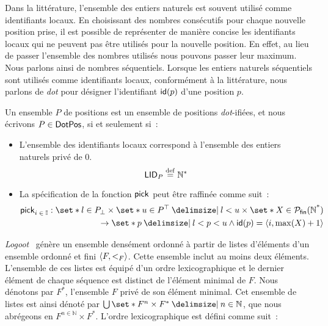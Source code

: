 Dans la littérature, l'ensemble des entiers naturels est souvent utilisé comme identifiants locaux.
En choisissant des nombres consécutifs pour chaque nouvelle position prise, il est possible de représenter de manière concise les identifiants locaux qui ne peuvent pas être utilisés pour la nouvelle position.
En effet, au lieu de passer l'ensemble des nombres utilisés nous pouvons passer leur maximum.
Nous parlons ainsi de nombres séquentiels.
Lorsque les entiers naturels séquentiels sont utilisés comme identifiants locaux, conformément à la littérature, nous parlons de \emph{dot} pour désigner l'identifiant $\trm{id}(p)$ d'une position $p$.

\begin{definition}\label{def:dot-pos}
Un ensemble $P$ de positions est un ensemble de positions \emph{dot}-ifiées, et nous écrivons $P \in \trm{DotPos}$, si et seulement si~:
\begin{itemize}
\item L'ensemble des identifiants locaux correspond à l'ensemble des entiers naturels privé de $0$.
\begin{equation*}
    \trm{LID}_P \defeq \mathbb{N}^*
\end{equation*}

\item La spécification de la fonction $\trm{pick}$ peut être raffinée comme suit~:
\begin{equation*}\begin{split}
    \trm{pick}_{i\;\in\;\mathbb{I}}: \set*{l \in P_{\bot}} \times \set*{u \in P^{\top} \given l < u} \times \set*{X \in \powerfset{\trm{\mathbb{N}^*}}}\\
    \to \set*{p \given l < p < u \land \trm{id}(p) = \tuple*{i, \max(X) + 1}}
\end{split}\end{equation*}
\end{itemize}
\end{definition}

\emph{Logoot}~\cite{weiss_2009_logoot} génère un ensemble densément ordonné à partir de listes d'éléments d'un ensemble ordonné et fini $\tuple*{F, <_F}$.
Cette ensemble inclut au moins deux éléments.
L'ensemble de ces listes est équipé d'un ordre lexicographique et le dernier élément de chaque séquence est distinct de l'élément minimal de $F$.
Nous dénotons par $F^*$, l'ensemble $F$ privé de son élément minimal.
Cet ensemble de listes est ainsi dénoté par $\bigcup \set*{F^n \times F^* \given n \in \mathbb{N}}$, que nous abrégeons en $F^{n \in \mathbb{N}} \times F^*$.
L'ordre lexicographique est défini comme suit~:

